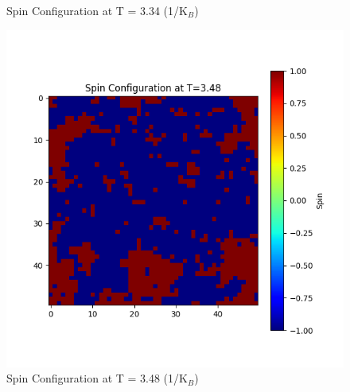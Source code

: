 \documentclass[11pt]{article}
\begin{document}
\begin{figure}[H]
\begin{minipage}{0.32\textwidth}
        \caption{Spin Configuration at T = 3.34 (1/K$_B$)}
        \label{fig:11}
    \end{minipage}\hfill
    \begin{minipage}{0.32\textwidth}
        \centering
        \includegraphics[width=\textwidth]{Spin_Configuration_at_T=3.48.png}
        \caption{Spin Configuration at T = 3.48 (1/K$_B$)}
        \label{fig:12}
    \end{minipage}
\end{figure}
\end{document}
